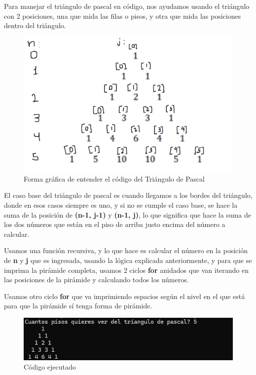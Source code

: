 \documentclass[letterpaper,12pt]{article}
\begin{document}
Para manejar el triángulo de pascal en código, nos ayudamos usando el triángulo con 2 posiciones, una que mida las filas o pisos, y otra que mida las posiciones dentro del triángulo.

\begin{figure}[H]
    \centering
    \includegraphics[width=15cm]{Imagenes/ejemplo.png}
    \caption*{\centering Forma gráfica de entender el código del Triángulo de Pascal}
\end{figure}

El caso base del triángulo de pascal es cuando llegamos a los bordes del triángulo, donde en esos casos siempre es uno, y si no se cumple el caso base, se hace la suma de la posición de \textbf{(n-1, j-1)} y \textbf{(n-1, j)}, lo que significa que hace la suma de los dos números que están en el piso de arriba justo encima del número a calcular.

\clearpage

Usamos una función recursiva, y lo que hace es calcular el número en la posición de \textbf{n} y \textbf{j} que es ingresada, usando la lógica explicada anteriormente, y para que se imprima la pirámide completa, usamos 2 ciclos \textbf{for} anidados que van iterando en las posiciones de la pirámide y calculando todos los números.

Usamos otro ciclo \textbf{for} que va imprimiendo espacios según el nivel en el que está para que la pirámide sí tenga forma de pirámide.

\begin{figure}[H]
    \centering
    \includegraphics[width=15cm]{Imagenes/pascal.png}
    \caption*{\centering Código ejecutado}
\end{figure}
\end{document}
